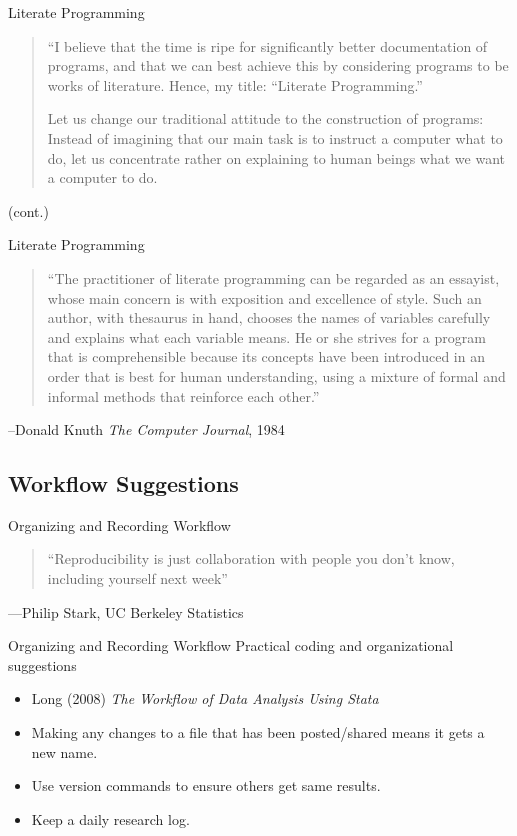 \documentclass{beamer}
\begin{document}
\begin{frame}{Literate Programming}
\begin{quote}
``I believe that the time is ripe for significantly better documentation of programs, and that we can best achieve this by considering programs to be works of literature. Hence, my title: ``Literate Programming.''

Let us change our traditional attitude to the construction of programs: Instead of imagining that our main task is to instruct a computer what to do, let us concentrate rather on explaining to human beings what we want a computer to do.
\end{quote}
(cont.)
\end{frame}

\begin{frame}{Literate Programming}
\begin{quote}
``The practitioner of literate programming can be regarded as an essayist, whose main concern is with exposition and excellence of style. Such an author, with thesaurus in hand, chooses the names of variables carefully and explains what each variable means. He or she strives for a program that is comprehensible because its concepts have been introduced in an order that is best for human understanding, using a mixture of formal and informal methods that reinforce each other.''
\end{quote}
--Donald Knuth \textit{The Computer Journal}, 1984
\href{http://www.literateprogramming.com/index.html}{}
\href{http://comjnl.oxfordjournals.org/content/27/2/97.full.pdf+html}{}
\end{frame}

\subsection{Workflow Suggestions}
\begin{frame}{Organizing and Recording Workflow}
\begin{quote}
``Reproducibility is just collaboration with people you don't know,
including yourself next week''
\end{quote}
\begin{flushright}
---Philip Stark, UC Berkeley Statistics
\end{flushright}
\end{frame}

\begin{frame}{Organizing and Recording Workflow}
 Practical coding and organizational suggestions
 \begin{itemize}
 \item Long (2008) \textit{The Workflow of Data Analysis Using Stata}
 \item Making any changes to a file that has been posted/shared means it gets a new name.
 \item Use version commands to ensure others get same results.
 \item Keep a daily research log.
\end{itemize}
\end{frame}
\end{document}
